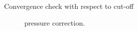 \documentclass[final,hyperref={pdfpagelabels=false},fleqn]{beamer}
\begin{document}
\begin{frame}{}
\begin{columns}[t]
\begin{column}{.48\linewidth}
\begin{block}{Convergence check with respect to cut-off}
\begin{figure}
{            pressure correction. }
        \end{figure}
      \end{block}
    \end{column}
  \end{columns}
  \vfill
  \end{frame}
\end{document}
